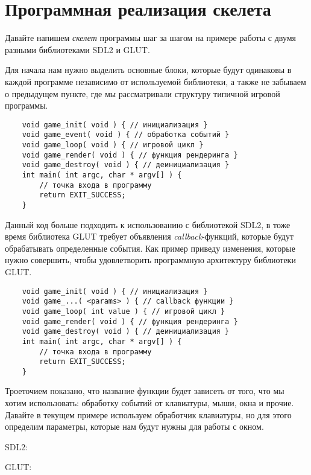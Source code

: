 \pagebreak

\section{Программная реализация скелета}
Давайте напишем \emph{скелет} программы шаг за шагом на примере работы с двумя разными библиотеками 
SDL2 и GLUT.

Для начала нам нужно выделить основные блоки, которые будут одинаковы в каждой программе независимо от 
используемой библиотеки, а также не забываем о предыдущем пункте, где мы рассматривали структуру типичной 
игровой программы.

\begin{lstlisting}
    void game_init( void ) { // инициализация }
    void game_event( void ) { // обработка событий }
    void game_loop( void ) { // игровой цикл }
    void game_render( void ) { // функция рендеринга }
    void game_destroy( void ) { // деинициализация }
    int main( int argc, char * argv[] ) {
        // точка входа в программу
        return EXIT_SUCCESS;
    }
\end{lstlisting}

Данный код больше подходить к использованию с библиотекой SDL2, в тоже время библиотека GLUT требует 
объявления \emph{callback}-функций, которые будут обрабатывать определенные события. Как пример приведу 
изменения, которые нужно совершить, чтобы удовлетворить программную архитектуру библиотеки GLUT.

\begin{lstlisting}
    void game_init( void ) { // инициализация }
    void game_...( <params> ) { // callback функции }
    void game_loop( int value ) { // игровой цикл }
    void game_render( void ) { // функция рендеринга }
    void game_destroy( void ) { // деинициализация }
    int main( int argc, char * argv[] ) {
        // точка входа в программу
        return EXIT_SUCCESS;
    }
\end{lstlisting}

Троеточием показано, что название функции будет зависеть от того, что мы хотим использовать: обработку 
событий от клавиатуры, мыши, окна и прочие. Давайте в текущем примере используем обработчик клавиатуры, но 
для этого определим параметры, которые нам будут нужны для работы с окном.

SDL2:


\pagebreak

GLUT:


